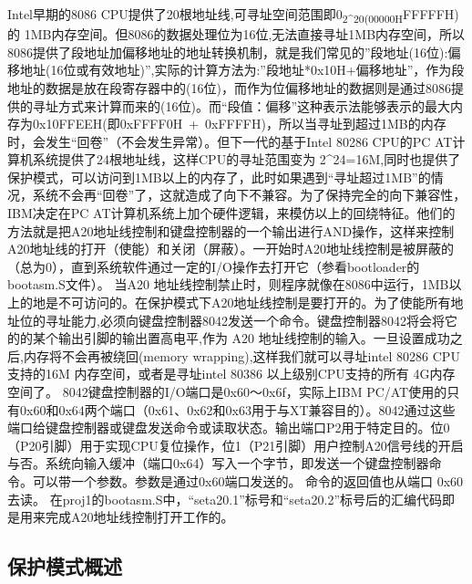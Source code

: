 Intel早期的8086
CPU提供了20根地址线,可寻址空间范围即0\textsubscript{2\^{}20(00000H}FFFFFH)的
1MB内存空间。但8086的数据处理位为16位,无法直接寻址1MB内存空间，所以8086提供了段地址加偏移地址的地址转换机制，就是我们常见的''段地址(16位):偏移地址(16位或有效地址)'',实际的计算方法为:''段地址*0x10H+偏移地址''，作为段地址的数据是放在段寄存器中的(16位)，而作为位偏移地址的数据则是通过8086提供的寻址方式来计算而来的(16位)。而``段值：偏移''这种表示法能够表示的最大内存为0x10FFEEH(即0xFFFF0H~+~0xFFFFH)，所以当寻址到超过1MB的内存时，会发生``回卷''（不会发生异常）。但下一代的基于Intel
80286 CPU的PC AT计算机系统提供了24根地址线，这样CPU的寻址范围变为
2\^{}24=16M,同时也提供了保护模式，可以访问到1MB以上的内存了，此时如果遇到``寻址超过1MB''的情况，系统不会再``回卷''了，这就造成了向下不兼容。为了保持完全的向下兼容性，IBM决定在PC
AT计算机系统上加个硬件逻辑，来模仿以上的回绕特征。他们的方法就是把A20地址线控制和键盘控制器的一个输出进行AND操作，这样来控制A20地址线的打开（使能）和关闭（屏蔽）。一开始时A20地址线控制是被屏蔽的（总为0），直到系统软件通过一定的I/O操作去打开它（参看bootloader的bootasm.S文件）。
当A20
地址线控制禁止时，则程序就像在8086中运行，1MB以上的地是不可访问的。在保护模式下A20地址线控制是要打开的。为了使能所有地址位的寻址能力,必须向键盘控制器8042发送一个命令。键盘控制器8042将会将它的的某个输出引脚的输出置高电平,作为
A20 地址线控制的输入。一旦设置成功之后,内存将不会再被绕回(memory
wrapping),这样我们就可以寻址intel 80286 CPU支持的16M
内存空间，或者是寻址intel 80386 以上级别CPU支持的所有 4G内存空间了。
8042键盘控制器的I/O端口是0x60～0x6f，实际上IBM
PC/AT使用的只有0x60和0x64两个端口（0x61、0x62和0x63用于与XT兼容目的）。8042通过这些端口给键盘控制器或键盘发送命令或读取状态。输出端口P2用于特定目的。位0（P20引脚）用于实现CPU复位操作，位1（P21引脚）用户控制A20信号线的开启与否。系统向输入缓冲（端口0x64）写入一个字节，即发送一个键盘控制器命令。可以带一个参数。参数是通过0x60端口发送的。
命令的返回值也从端口 0x60去读。
在proj1的bootasm.S中，``seta20.1''标号和``seta20.2''标号后的汇编代码即是用来完成A20地址线控制打开工作的。

\subsection{保护模式概述}\label{ux4fddux62a4ux6a21ux5f0fux6982ux8ff0}


